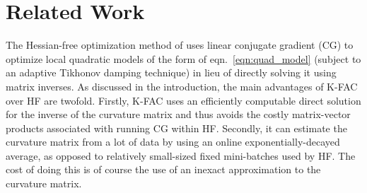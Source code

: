 \documentclass[12pt]{article}
\newcommand{\acronym}{K-FAC}
\newcommand{\expected}{\operatorname{E}}
\begin{document}
%
%
%
%
%



\section{Related Work}

\label{sec:related}

The Hessian-free optimization method of \citet{HF} uses linear conjugate gradient (CG) to optimize local quadratic models of the form of eqn.~\ref{eqn:quad_model} (subject to an adaptive Tikhonov damping technique) in lieu of directly solving it using matrix inverses.  As discussed in the introduction, the main advantages of \acronym{} over HF are twofold.  Firstly, \acronym{} uses an efficiently computable direct solution for the inverse of the curvature matrix and thus avoids the costly matrix-vector products associated with running CG within HF.  Secondly, it can estimate the curvature matrix from a lot of data by using an online exponentially-decayed average, as opposed to relatively small-sized fixed mini-batches used by HF.  The cost of doing this is of course the use of an inexact approximation to the curvature matrix.
\end{document}
